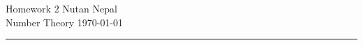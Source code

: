 

{\large
\noindent Homework 2\hfill
Nutan Nepal}\\
{\large
\noindent Number Theory \hfill \today}\\
\hrule
    \begin{questions}
        
        
        
        
        
    \end{questions}

